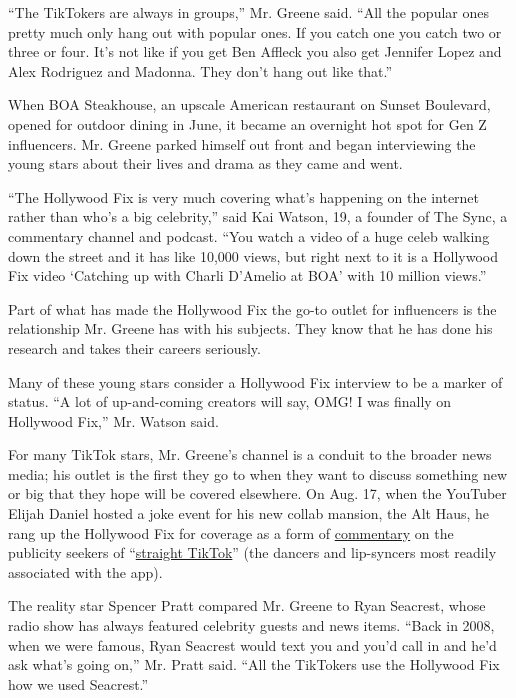 ``The TikTokers are always in groups,'' Mr. Greene said. ``All the
popular ones pretty much only hang out with popular ones. If you catch
one you catch two or three or four. It's not like if you get Ben Affleck
you also get Jennifer Lopez and Alex Rodriguez and Madonna. They don't
hang out like that.''

When BOA Steakhouse, an upscale American restaurant on Sunset Boulevard,
opened for outdoor dining in June, it became an overnight hot spot for
Gen Z influencers. Mr. Greene parked himself out front and began
interviewing the young stars about their lives and drama as they came
and went.

``The Hollywood Fix is very much covering what's happening on the
internet rather than who's a big celebrity,'' said Kai Watson, 19, a
founder of The Sync, a commentary channel and podcast. ``You watch a
video of a huge celeb walking down the street and it has like 10,000
views, but right next to it is a Hollywood Fix video `Catching up with
Charli D'Amelio at BOA' with 10 million views.''

Part of what has made the Hollywood Fix the go-to outlet for influencers
is the relationship Mr. Greene has with his subjects. They know that he
has done his research and takes their careers seriously.

Many of these young stars consider a Hollywood Fix interview to be a
marker of status. ``A lot of up-and-coming creators will say, OMG! I was
finally on Hollywood Fix,'' Mr. Watson said.

For many TikTok stars, Mr. Greene's channel is a conduit to the broader
news media; his outlet is the first they go to when they want to discuss
something new or big that they hope will be covered elsewhere. On Aug.
17, when the YouTuber Elijah Daniel hosted a joke event for his new
collab mansion, the Alt Haus, he rang up the Hollywood Fix for coverage
as a form of
\href{https://twitter.com/GECOFTH3WEEK/status/1295481749431099392}{commentary}
on the publicity seekers of
``\href{https://www.nytimes3xbfgragh.onion/2020/06/10/style/elite-tiktok.html}{straight
TikTok}'' (the dancers and lip-syncers most readily associated with the
app).

The reality star Spencer Pratt compared Mr. Greene to Ryan Seacrest,
whose radio show has always featured celebrity guests and news items.
``Back in 2008, when we were famous, Ryan Seacrest would text you and
you'd call in and he'd ask what's going on,'' Mr. Pratt said. ``All the
TikTokers use the Hollywood Fix how we used Seacrest.''


